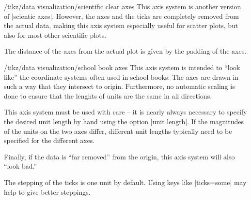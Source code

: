 \begin{key}{/tikz/data visualization/scientific clear axes}
  This axis system is another version of |scientic axes|. However, the
  axes and the ticks are completely removed from the actual data,
  making this axis system especially useful for scatter plots, but
  also for most other scientific plots.
      
\begin{codeexample}[]
\end{codeexample}

  The distance of the axes from the actual plot is given by the
  padding of the axes.
\end{key}



\begin{key}{/tikz/data visualization/school book axes}
  This axis system is intended to ``look like'' the coordinate systems
  often used in school books: The axes are drawn in such a way that
  they intersect to origin. Furthermore, no automatic
  scaling is done to ensure that the lenghts of units are the same in
  all directions.

  This axis system must be used with care -- it is nearly always
  necessary to specify the desired unit length by hand using the
  option |unit length|. If the magnitudes of the units on the two axes
  differ, different unit lengths typically need to be specified for
  the different axes.

  Finally, if the data is ``far removed'' from the origin, this
  axis system will also ``look bad.''

\begin{codeexample}[]
\end{codeexample}

  The stepping of the ticks is one unit by default. Using keys like
  |ticks=some| may help to give better steppings.
\end{key}




